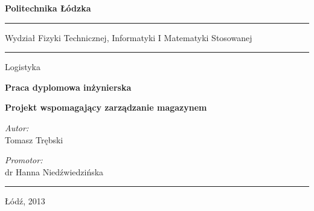 \thispagestyle{empty}

\begin{center}
\huge \bf
Politechnika Łódzka
\vskip -20pt
\rule{\textwidth}{.1mm}
\vskip 10pt
\large
Wydział Fizyki Technicznej, Informatyki I Matematyki Stosowanej
\rule{\textwidth}{.1mm}
\vskip 10pt
Logistyka
\end{center}

\vskip 58pt

\vskip 18pt

\begin{center}
{\bf \large Praca dyplomowa inżynierska}
\end {center}

\vskip 18pt

\begin{adjustwidth}{20pt}{20pt}
\begin{center}
{\bf \normalsize Projekt wspomagający zarządzanie magazynem}
\end{center}
\end{adjustwidth}

\vskip 40pt
\begin{flushleft}
{\emph{Autor:} \\ Tomasz Trębski}
\end{flushleft}


\begin{flushright}
\vskip -36pt
{\emph{Promotor:} \\ dr Hanna Niedźwiedzińska }
\end{flushright}

\vfill
\noindent
\rule{\textwidth}{.1mm}
\begin{center}
Łódź, 2013
\end{center}